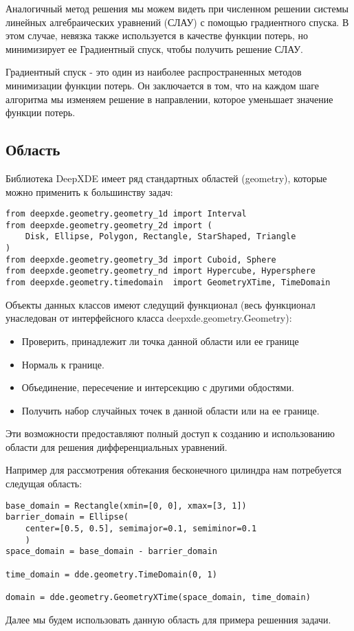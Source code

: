 Аналогичный метод решения мы можем видеть при численном решении системы линейных алгебраических уравнений (СЛАУ)
с помощью градиентного спуска. В этом случае, невязка также используется в качестве функции потерь, но минимизирует
ее Градиентный спуск, чтобы получить решение СЛАУ.

Градиентный спуск - это один из наиболее распространенных методов минимизации функции потерь. Он заключается в том,
что на каждом шаге алгоритма мы изменяем решение в направлении, которое уменьшает значение функции потерь.

\subsection{Область}
Библиотека DeepXDE имеет ряд стандартных областей (geometry), которые можно применить к большинству задач:
\begin{verbatim}
from deepxde.geometry.geometry_1d import Interval
from deepxde.geometry.geometry_2d import (
    Disk, Ellipse, Polygon, Rectangle, StarShaped, Triangle
)
from deepxde.geometry.geometry_3d import Cuboid, Sphere
from deepxde.geometry.geometry_nd import Hypercube, Hypersphere
from deepxde.geometry.timedomain  import GeometryXTime, TimeDomain
\end{verbatim}
Объекты данных классов имеют следущий функционал (весь функционал унаследован от интерфейсного класса deepxde.geometry.Geometry):
\begin{itemize}
    \item Проверить, принадлежит ли точка данной области или ее границе
    \item Нормаль к границе.
    \item Объединение, пересечение и интерсекцию с другими обдостями.
    \item Получить набор случайных точек в данной области или на ее границе.
\end{itemize}
Эти возможности предоставляют полный доступ к созданию и использованию области для решения
дифференциальных уравнений.

Например для рассмотрения обтекания бесконечного цилиндра нам потребуется следущая область:
\begin{verbatim}
base_domain = Rectangle(xmin=[0, 0], xmax=[3, 1])
barrier_domain = Ellipse(
    center=[0.5, 0.5], semimajor=0.1, semiminor=0.1
    )
space_domain = base_domain - barrier_domain

time_domain = dde.geometry.TimeDomain(0, 1)

domain = dde.geometry.GeometryXTime(space_domain, time_domain)
\end{verbatim}
Далее мы будем использовать данную область для примера решенния задачи.

